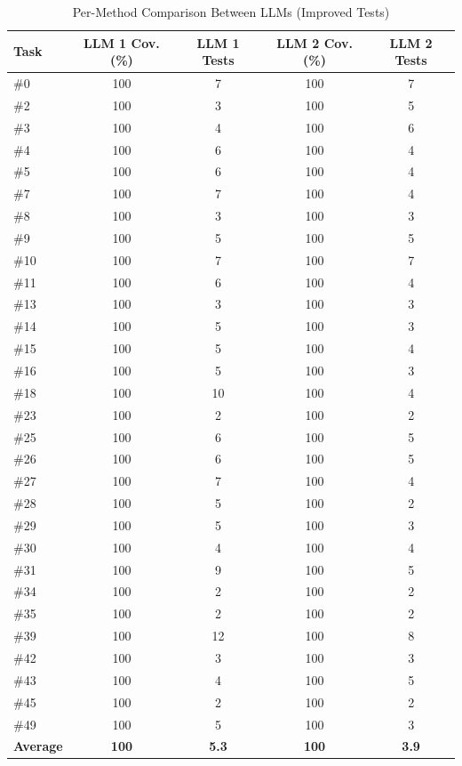 \documentclass[12pt, a4paper]{article}
\begin{document}
\begin{table}[H]
\centering
\caption{Per-Method Comparison Between LLMs (Improved Tests)}
\label{tab:per-method-comparison}
\begin{tabularx}{\textwidth}{l c c c c}
\toprule
\textbf{Task} & \textbf{LLM 1 Cov.(\%)} & \textbf{LLM 1 Tests} & \textbf{LLM 2 Cov.(\%)} & \textbf{LLM 2 Tests} \\
\midrule
\#0  & 100 & 7  & 100 & 7  \\
\#2  & 100 & 3  & 100 & 5  \\
\#3  & 100 & 4  & 100 & 6  \\
\#4  & 100 & 6  & 100 & 4  \\
\#5  & 100 & 6  & 100 & 4  \\
\#7  & 100 & 7  & 100 & 4  \\
\#8  & 100 & 3  & 100 & 3  \\
\#9  & 100 & 5  & 100 & 5  \\
\#10 & 100 & 7  & 100 & 7  \\
\#11 & 100 & 6  & 100 & 4  \\
\#13 & 100 & 3  & 100 & 3  \\
\#14 & 100 & 5  & 100 & 3  \\
\#15 & 100 & 5  & 100 & 4  \\
\#16 & 100 & 5  & 100 & 3  \\
\#18 & 100 & 10 & 100 & 4  \\
\#23 & 100 & 2  & 100 & 2  \\
\#25 & 100 & 6  & 100 & 5  \\
\#26 & 100 & 6  & 100 & 5  \\
\#27 & 100 & 7  & 100 & 4  \\
\#28 & 100 & 5  & 100 & 2  \\
\#29 & 100 & 5  & 100 & 3  \\
\#30 & 100 & 4  & 100 & 4  \\
\#31 & 100 & 9  & 100 & 5  \\
\#34 & 100 & 2  & 100 & 2  \\
\#35 & 100 & 2  & 100 & 2  \\
\#39 & 100 & 12 & 100 & 8  \\
\#42 & 100 & 3  & 100 & 3  \\
\#43 & 100 & 4  & 100 & 5  \\
\#45 & 100 & 2  & 100 & 2  \\
\#49 & 100 & 5  & 100 & 3  \\
\midrule
\textbf{Average} & \textbf{100} & \textbf{5.3} & \textbf{100} & \textbf{3.9} \\
\bottomrule
\end{tabularx}
\end{table}
\end{document}
